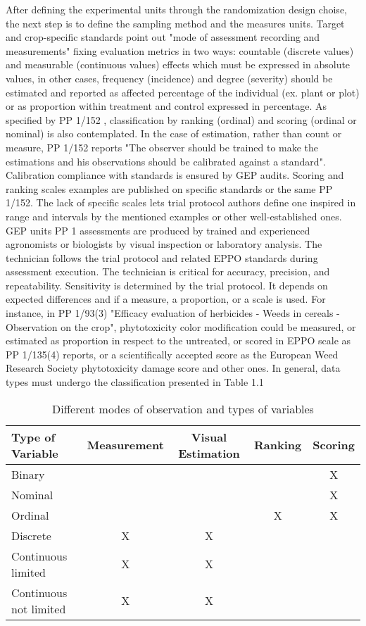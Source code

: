 \documentclass[12pt,a4paper,oneside]{report}
\begin{document}
After defining the experimental units through the randomization design choise,
the next step is to define the sampling method and the measures units.
Target and crop-specific standards point out "mode of
assessment recording and measurements" fixing evaluation metrics in two ways:
countable (discrete values) and measurable (continuous values) effects which must be
expressed in absolute values, in other cases, frequency (incidence) and degree
(severity) should be estimated and reported as affected percentage of the individual (ex.
plant or plot) or as proportion within treatment and control expressed in percentage. As
specified by PP 1/152 \cite{EPPO_PP1_152}, classification by ranking (ordinal) and scoring (ordinal or
nominal) is also contemplated. In the case of estimation, rather than count or measure,
PP 1/152 reports "The observer should be trained to make the estimations and his
observations should be calibrated against a standard". Calibration compliance with
standards is ensured by GEP audits. Scoring and ranking scales examples are
published on specific standards or the same PP 1/152. The lack of specific scales lets
trial protocol authors define one inspired in range and intervals by the mentioned
examples or other well-established ones.
GEP units PP 1 assessments are produced by trained and experienced
agronomists or biologists by visual inspection or laboratory analysis. The technician
follows the trial protocol and related EPPO standards during assessment execution. The
technician is critical for accuracy, precision, and repeatability. Sensitivity is determined
by the trial protocol. It depends on expected differences and if a measure, a proportion,
or a scale is used. For instance, in PP 1/93(3) \cite{EPPO_PP1_93} "Efficacy evaluation of herbicides -
Weeds in cereals - Observation on the crop", phytotoxicity color modification could be
measured, or estimated as proportion in respect to the untreated, or scored in EPPO
scale as PP 1/135(4) reports, or a scientifically accepted score as the European Weed
Research Society phytotoxicity damage score \cite{EWRS_score} and other ones.
In general, data types must undergo the classification presented in Table 1.1

\begin{table}[ht]
\caption{Different modes of observation and types of variables}
\label{tab:data_types}
\centering
\begin{tabular}{|l|c|c|c|c|}
\hline
\textbf{Type of Variable} & \textbf{Measurement} & \textbf{Visual Estimation} & \textbf{Ranking} & \textbf{Scoring} \\
\hline
Binary & & & & X \\
\hline
Nominal & & & & X \\
\hline
Ordinal & & & X & X \\
\hline
Discrete & X & X & & \\
\hline
Continuous limited & X & X & & \\
\hline
Continuous not limited & X & X & & \\
\hline
\end{tabular}
\end{table}
\end{document}

